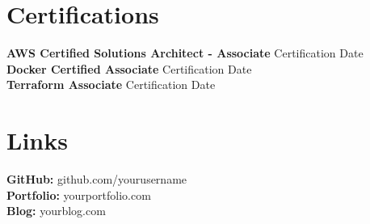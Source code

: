 \documentclass[letterpaper,10pt]{article}
\begin{document}
\section*{Certifications}
\textbf{AWS Certified Solutions Architect - Associate} \hfill Certification Date \\
\textbf{Docker Certified Associate} \hfill Certification Date \\
\textbf{Terraform Associate} \hfill Certification Date

\section*{Links}
\textbf{GitHub:} github.com/yourusername \\
\textbf{Portfolio:} yourportfolio.com \\
\textbf{Blog:} yourblog.com
\end{document}
